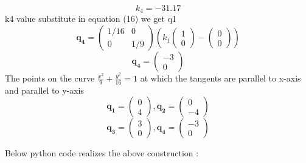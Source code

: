 \documentclass[10pt, a4paper]{article}
\newcommand{\myvec}[1]{\ensuremath{\begin{pmatrix}#1\end{pmatrix}}}
\let\vec\mathbf
\begin{document}
\begin{equation}
k_4=-31.17
\end{equation}
k4 value substitute in equation (16) we get q1\\
\begin{equation}
\vec{q_4}={\myvec{1/16&0\\0&1/9}(k_1\myvec{1\\0}-\myvec{0\\0})}
\end{equation}
\begin{equation}
\vec{q_4}=\myvec{-3\\0}
\end{equation}
The points on the curve $\frac{x^2}{9}+\frac{y^2}{16}=1$ at which the tangents are parallel to x-axis and parallel to y-axis\\
\begin{equation}
\vec{q_1}=\myvec{0\\4},\vec{q_2}=\myvec{0\\-4}
\end{equation}
\begin{equation}
\vec{q_3}=\myvec{3\\0},\vec{q_4}=\myvec{-3\\0}
\end{equation}
\begin{center}
Below python code realizes the above construction :
\end{center}
\end{document}
